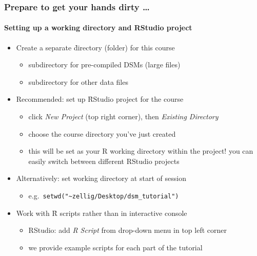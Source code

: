 \documentclass[t]{beamer} %
\begin{document}
\begin{frame}
  \frametitle{Prepare to get your hands dirty \ldots}
  \framesubtitle{Setting up a working directory and RStudio project}

  \begin{itemize}
  \item Create a separate \h{directory} (folder) for this course
    \begin{itemize}
    \item subdirectory  for pre-compiled DSMs (large files)
    \item subdirectory  for other data files
    \end{itemize}
    \gap
  \item Recommended: set up \h{RStudio project} for the course
    \begin{itemize}
    \item click \emph{New Project} (top right corner), then \emph{Existing Directory}
    \item choose the course directory you've just created
    \item this will be set as your R working directory within the project!
      \itemhand you can easily switch between different RStudio projects
    \end{itemize}
    \gap
  \item Alternatively: set working directory at start of session
    \begin{itemize}
    \item e.g.\ \texttt{setwd("\textasciitilde{}zellig/Desktop/dsm\_tutorial")}
    \end{itemize}
    \gap
  \item Work with \h{R scripts} rather than in interactive console
    \begin{itemize}
    \item RStudio: add \emph{R Script} from drop-down menu in top left corner
    \item we provide example scripts for each part of the tutorial
    \end{itemize}
  \end{itemize}
\end{frame}
\end{document}
